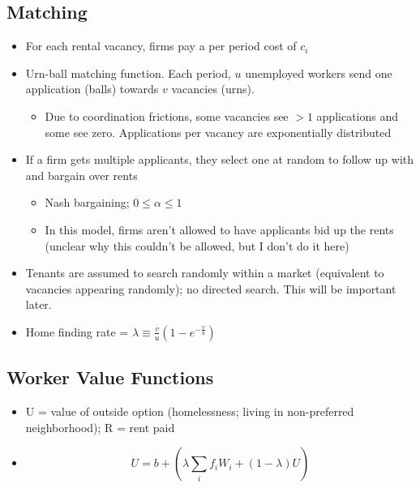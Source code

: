 \documentclass{article}
\begin{document}
\subsection{Matching}
\begin{itemize}
    \item For each rental vacancy, firms pay a per period cost of $c_i$
    \item Urn-ball matching function. Each period, $u$ unemployed workers send one application (balls) towards $v$ vacancies (urns).
    \begin{itemize}
        \item Due to coordination frictions, some vacancies see $>1$ applications and some see zero. Applications per vacancy are exponentially distributed
    \end{itemize}
    \item If a firm gets multiple applicants, they select one at random to follow up with and bargain over rents
    \begin{itemize}
        \item Nash bargaining; $0 \leq \alpha \leq 1$
        \item In this model, firms aren't allowed to have applicants bid up the rents (unclear why this couldn't be allowed, but I don't do it here)
        
    \end{itemize}
    \item Tenants are assumed to search randomly within a market (equivalent to vacancies appearing randomly); no directed search. This will be important later.
    \item Home finding rate = $\lambda \equiv \frac{v}{u}(1-e^{-\frac{v}{u}})$
\end{itemize}

\subsection{Worker Value Functions}
\begin{itemize}
    \item U = value of outside option (homelessness; living in non-preferred neighborhood); R = rent paid
    \item \begin{equation}
        U = b + \left(\lambda \sum_{i} f_iW_i + (1-\lambda)U\right)\label{eq:worker-val}
    \end{equation}
\end{itemize}
\end{document}
